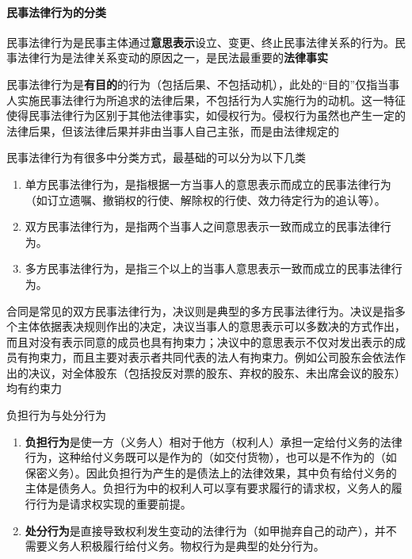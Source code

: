 \documentclass[UTF8,12pt]{ctexart}
\numberwithin{equation}{section} %
\numberwithin{figure}{section}
\numberwithin{table}{section}
\begin{document}
	\paragraph{民事法律行为的分类}
	民事法律行为是民事主体通过\textbf{意思表示}设立、变更、终止民事法律关系的行为。民事法律行为是法律关系变动的原因之一，是民法最重要的\textbf{法律事实}
	
	民事法律行为是\textbf{有目的}的行为（包括后果、不包括动机），此处的“目的”仅指当事人实施民事法律行为所追求的法律后果，不包括行为人实施行为的动机。这一特征使得民事法律行为区别于其他法律事实，如侵权行为。侵权行为虽然也产生一定的法律后果，但该法律后果并非由当事人自己主张，而是由法律规定的
	
	民事法律行为有很多中分类方式，最基础的可以分为以下几类
	\begin{enumerate}
		\item 单方民事法律行为，是指根据一方当事人的意思表示而成立的民事法律行为（如订立遗嘱、撤销权的行使、解除权的行使、效力待定行为的追认等）。
		
		\item 双方民事法律行为，是指两个当事人之间意思表示一致而成立的民事法律行为。
		
		\item 多方民事法律行为，是指三个以上的当事人意思表示一致而成立的民事法律行为。
	\end{enumerate}
	
	合同是常见的双方民事法律行为，决议则是典型的多方民事法律行为。决议是指多个主体依据表决规则作出的决定，决议当事人的意思表示可以多数决的方式作出，而且对没有表示同意的成员也具有拘束力；决议中的意思表示不仅对发出表示的成员有拘束力，而且主要对表示者共同代表的法人有拘束力。例如公司股东会依法作出的决议，对全体股东（包括投反对票的股东、弃权的股东、未出席会议的股东）均有约束力
	
	负担行为与处分行为
	\begin{enumerate}
		\item \textbf{负担行为}是使一方（义务人）相对于他方（权利人）承担一定给付义务的法律行为，这种给付义务既可以是作为的（如交付货物），也可以是不作为的（如保密义务）。因此负担行为产生的是债法上的法律效果，其中负有给付义务的主体是债务人。负担行为中的权利人可以享有要求履行的请求权，义务人的履行行为是请求权实现的重要前提。
		
		\item \textbf{处分行为}是直接导致权利发生变动的法律行为（如甲抛弃自己的动产），并不需要义务人积极履行给付义务。物权行为是典型的处分行为。
	\end{enumerate}
	
\end{document}
